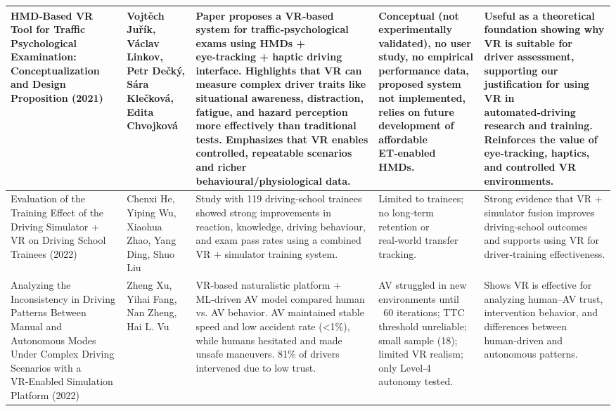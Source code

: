 {\begin{longtable}{|p{}|p{}|>{\raggedright\arraybackslash}p{}|>{\raggedright\arraybackslash}p{}|>{\raggedright\arraybackslash}p{}|}
HMD‑Based VR Tool for Traffic Psychological Examination: Conceptualization and Design Proposition (2021)~\cite{Jurik2021} & Vojtěch Juřík, Václav Linkov, Petr Dečký, Sára Klečková, Edita Chvojková & Paper proposes a VR‑based system for traffic‑psychological exams using HMDs + eye‑tracking + haptic driving interface. Highlights that VR can measure complex driver traits like situational awareness, distraction, fatigue, and hazard perception more effectively than traditional tests. Emphasizes that VR enables controlled, repeatable scenarios and richer behavioural/physiological data. & Conceptual (not experimentally validated), no user study, no empirical performance data, proposed system not implemented, relies on future development of affordable ET‑enabled HMDs. & Useful as a theoretical foundation showing why VR is suitable for driver assessment, supporting our justification for using VR in automated‑driving research and training. Reinforces the value of eye‑tracking, haptics, and controlled VR environments. \\ \hline
Evaluation of the Training Effect of the Driving Simulator + VR on Driving School Trainees (2022)~\cite{He2022} & Chenxi He, Yiping Wu, Xiaohua Zhao, Yang Ding, Shuo Liu & Study with 119 driving‑school trainees showed strong improvements in reaction, knowledge, driving behaviour, and exam pass rates using a combined VR + simulator training system. & Limited to trainees; no long‑term retention or real‑world transfer tracking. & Strong evidence that VR + simulator fusion improves driving‑school outcomes and supports using VR for driver‑training effectiveness. \\ \hline
Analyzing the Inconsistency in Driving Patterns Between Manual and Autonomous Modes Under Complex Driving Scenarios with a VR‑Enabled Simulation Platform (2022)~\cite{Xu2022} & Zheng Xu, Yihai Fang, Nan Zheng, Hai L. Vu & VR‑based naturalistic platform + ML‑driven AV model compared human vs. AV behavior. AV maintained stable speed and low accident rate (<1\%), while humans hesitated and made unsafe maneuvers. 81\% of drivers intervened due to low trust. & AV struggled in new environments until ~60 iterations; TTC threshold unreliable; small sample (18); limited VR realism; only Level‑4 autonomy tested. & Shows VR is effective for analyzing human–AV trust, intervention behavior, and differences between human‑driven and autonomous patterns. \\ \hline

\end{longtable}}
